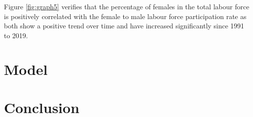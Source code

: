\documentclass[11pt,a4paper,]{article}
\begin{document}
Figure \ref{fig:graph5} verifies that the percentage of females in the total labour force is positively correlated with the female to male labour force participation rate as both show a positive trend over time and have increased significantly since 1991 to 2019.

\section*{Model}

\section*{Conclusion}

\printbibliography
\end{document}
